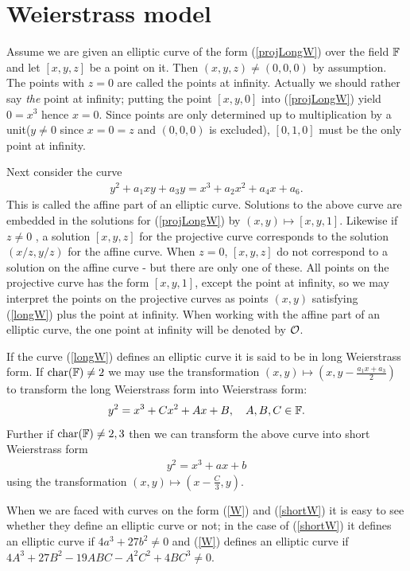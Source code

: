 \section{Weierstrass model}
\label{sec:WeierstrassForm}
Assume we are given an elliptic curve of the form (\ref{projLongW}) over the field $\mathbb{F}$ and let $[x,y,z]$ be a point on it. Then $(x,y,z)\neq (0,0,0)$ by assumption. The points with $z=0$ are called the points at infinity. Actually we should rather say \textit{the} point at infinity; putting the point $[x,y,0]$ into (\ref{projLongW}) yield $0=x^3$ hence $x=0$. Since points are only determined up to multiplication by a unit($y\neq 0$ since $x=0=z$ and $(0,0,0)$ is excluded), $[0,1,0]$ must be the only point at infinity.

Next consider the curve 
\begin{align}\label{longW}
	y^2+a_1xy+a_3y = x^3+a_2x^2+a_4x+a_6.
\end{align}
This is called the affine part of an elliptic curve. Solutions to the above curve are embedded in the solutions for (\ref{projLongW}) by $(x,y)\mapsto [x,y,1]$. Likewise if $z\neq 0$ , a solution $[x,y,z]$ for the projective curve corresponds to the solution $(x/z,y/z)$ for the affine curve. When $z=0$, $[x,y,z]$ do not correspond to a solution on the affine curve - but there are only one of these. All points on the projective curve has the form $[x,y,1]$, except the point at infinity, so we may interpret the points on the projective curves as points $(x,y)$ satisfying (\ref{longW}) plus the point at infinity. When working with the affine part of an elliptic curve, the one point at infinity will be denoted by $\mathcal{O}$.

If the curve (\ref{longW}) defines an elliptic curve it is said to be in long Weierstrass form. If $\text{char}(\mathbb{F})\neq 2$ we may use the transformation $(x,y)\mapsto \left( x,y-\frac{a_1x+a_3}{2}\right)$ to transform the long Weierstrass form into Weierstrass form: 
\begin{align}\label{W}
	y^2=x^3+Cx^2+Ax+B,\quad A,B,C\in\mathbb{F}.
\end{align}
Further if $\text{char}(\mathbb{F})\neq 2,3$ then we can transform the above curve into short Weierstrass form
\begin{align}\label{shortW}
	y^2=x^3+ax+b
\end{align}
using the transformation $(x,y)\mapsto \left(x-\frac{C}{3},y\right)$.

When we are faced with curves on the form (\ref{W}) and (\ref{shortW}) it is easy to see whether they define an elliptic curve or not; in the case of (\ref{shortW}) it defines an elliptic curve if $4a^3+27b^2\neq 0$ and (\ref{W}) defines an elliptic curve if $4A^3+27B^2-19ABC-A^2C^2+4BC^3\neq 0$.

